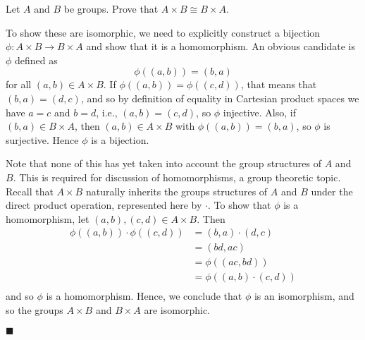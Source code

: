 \documentclass[12pt]{article}
\renewcommand{\qed}{\hfill$\blacksquare$}
\renewenvironment{proof}{\begin{addmargin}[1em]{0em}\begin{newproof}}{\end{newproof}\end{addmargin}\qed}
\newenvironment{problem}[2][Exercise]{\begin{trivlist}
\item[\hskip \labelsep {\bfseries #1}\hskip \labelsep {\bfseries #2.}]}{\end{trivlist}}
\begin{document}
\begin{problem}{1.6.11}
Let $A$ and $B$ be groups. Prove that $A\times B \cong B \times A$.
\end{problem}
\begin{proof}
To show these are isomorphic, we need to explicitly construct a bijection $\phi: A\times B \rightarrow B\times A$ and show that it is a homomorphism. An obvious candidate is $\phi$ defined as
$$ \phi\left(\left(a,b\right)\right) = \left(b,a\right) $$
for all $\left(a,b\right)\in A\times B$. If $\phi\left(\left(a,b\right)\right)=\phi\left(\left(c,d\right)\right)$, that means that $\left(b,a\right)=\left(d,c\right)$, and so by definition of equality in Cartesian product spaces we have $a=c$ and $b=d$, i.e., $\left(a,b\right)=\left(c,d\right)$, so $\phi$ injective. Also, if $\left(b,a\right)\in B\times A$, then $\left(a,b\right)\in A\times B$ with $\phi\left(\left(a,b\right)\right)=\left(b,a\right)$, so $\phi$ is surjective. Hence $\phi$ is a bijection.

Note that none of this has yet taken into account the group structures of $A$ and $B$. This is required for discussion of homomorphisms, a group theoretic topic. Recall that $A\times B$ naturally inherits the groups structures of $A$ and $B$ under the direct product operation, represented here by $\cdot$. To show that $\phi$ is a homomorphism, let $\left(a,b\right),\left(c,d\right)\in A\times B$. Then
\begin{equation*}
    \begin{split}
        \phi\left(\left(a,b\right)\right) \cdot  \phi\left(\left(c,d\right)\right) & = \left(b,a\right)\cdot \left(d,c\right) \\
        & = \left(bd,ac\right) \\
        & = \phi\left(\left(ac,bd\right)\right) \\
        & = \phi\left(\left(a,b\right)\cdot\left(c,d\right)\right) \\
    \end{split}
\end{equation*}
and so $\phi$ is a homomorphism. Hence, we conclude that $\phi$ is an isomorphism, and so the groups $A\times B$ and $B\times A$ are isomorphic.
\end{proof}
\end{document}
